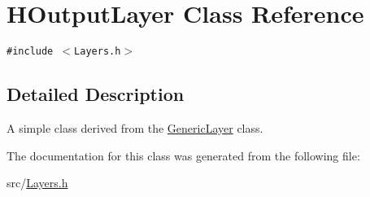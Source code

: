 \hypertarget{classHOutputLayer}{
\section{HOutput\-Layer Class Reference}
\label{classHOutputLayer}
}
{\tt \#include $<$Layers.h$>$}



\subsection{Detailed Description}
A simple class derived from the \hyperlink{classGenericLayer}{Generic\-Layer} class. 



The documentation for this class was generated from the following file:\begin{CompactItemize}
\item 
src/\hyperlink{Layers_8h}{Layers.h}\end{CompactItemize}
